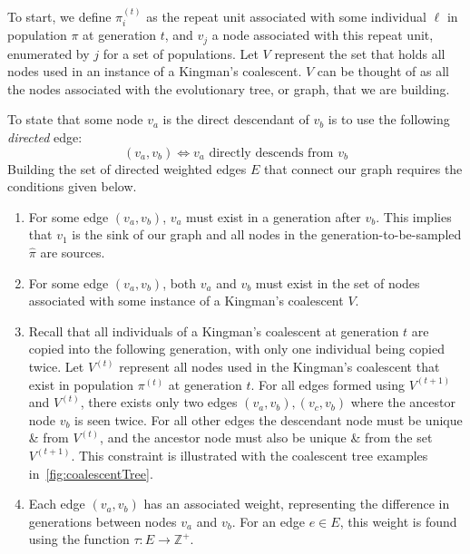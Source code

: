 To start, we define $\pi^{(t)}_i$ as the repeat unit associated with some individual $\ell$ in population $\pi$ at
generation $t$, and $v_j$ a node associated with this repeat unit, enumerated by $j$ for a set of
populations.
Let $V$ represent the set that holds all nodes used in an instance of a Kingman's coalescent.
$V$ can be thought of as all the nodes associated with the evolutionary tree, or graph, that we are building.

To state that some node $v_a$ is the direct descendant of $v_b$ is to use the following \emph{directed} edge:
\begin{equation}
    (v_a, v_b) \Leftrightarrow v_a \text{ directly descends from } v_b
\end{equation}
Building the set of directed weighted edges $E$ that connect our graph requires the conditions given below.
\begin{enumerate}
    \item For some edge $(v_a, v_b)$, $v_a$ must exist in a generation after $v_b$.
        This implies that $v_1$ is the sink of our graph and all nodes in the generation-to-be-sampled $\hat{\pi}$ are
        sources.
    \item For some edge $(v_a, v_b)$, both $v_a$ and $v_b$ must exist in the set of nodes associated with some instance
        of a Kingman's coalescent $V$.
    \item Recall that all individuals of a Kingman's coalescent at generation $t$ are copied into the following
        generation, with only one individual being copied twice.
        Let $V^{(t)}$ represent all nodes used in the Kingman's coalescent that exist in population $\pi^{(t)}$ at
        generation $t$.
        For all edges formed using $V^{(t+1)}$ and $V^{(t)}$, there exists only two edges $(v_a, v_b), (v_c, v_b)$ where
        the ancestor node $v_b$ is seen twice.
        For all other edges the descendant node must be unique \& from $V^{(t)}$, and the ancestor node must also be
        unique \& from the set $V^{(t+1)}$.
        This constraint is illustrated with the coalescent tree examples in~\autoref{fig:coalescentTree}.
    \item Each edge $(v_a, v_b)$ has an associated weight, representing the difference in generations between nodes
        $v_a$ and $v_b$.
        For an edge $e \in E$, this weight is found using the function $\tau : E \rightarrow \mathbb{Z}^+$.

\end{enumerate}

